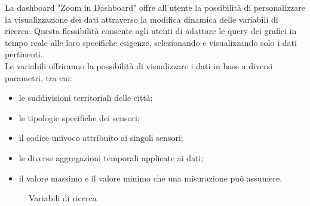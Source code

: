 La dashboard "Zoom in Dashboard" offre all'utente la possibilità di personalizzare la visualizzazione dei dati attraverso la modifica dinamica delle variabili di ricerca. Questa flessibilità consente agli utenti di adattare le query dei grafici in tempo reale alle loro specifiche esigenze, selezionando e visualizzando solo i dati pertinenti. \\
Le variabili offriranno la possibilità di visualizzare i dati in base a diversi parametri, tra cui:
\begin{itemize}
    \item le suddivisioni territoriali delle città;
    \item le tipologie specifiche dei sensori;
    \item il codice univoco attribuito ai singoli sensori;
    \item le diverse aggregazioni temporali applicate ai dati;
    \item il valore massimo e il valore minimo che una misurazione può assumere.
\end{itemize}
\begin{figure}[H]
    \centering
    \caption{Variabili di ricerca}
    \label{fig:my_label}
\end{figure}



